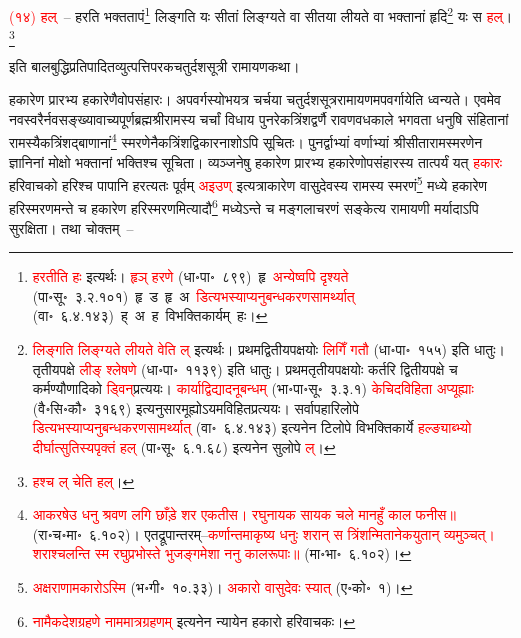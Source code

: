 \begin{sloppypar}\justifying\noindent\hspace{10mm} \textcolor{red}{(१४) हल्}~– हरति भक्त\-तापं\footnote{\textcolor{red}{हरतीति हः} इत्यर्थः। \textcolor{red}{हृञ् हरणे} (धा॰पा॰~८९९)~\arrow हृ~\arrow \textcolor{red}{अन्येष्वपि दृश्यते} (पा॰सू॰~३.२.१०१)~\arrow हृ~ड~\arrow हृ~अ~\arrow \textcolor{red}{डित्यभस्याप्यनु\-बन्धकरण\-सामर्थ्यात्} (वा॰~६.४.१४३)~\arrow ह्~अ~\arrow ह~\arrow विभक्तिकार्यम्~\arrow हः।} लिङ्गति यः सीतां लिङ्ग्यते वा सीतया लीयते वा भक्तानां हृदि\footnote{\textcolor{red}{लिङ्गति लिङ्ग्यते लीयते वेति ल्} इत्यर्थः। प्रथम\-द्वितीय\-पक्षयोः \textcolor{red}{लिगिँ गतौ} (धा॰पा॰~१५५) इति धातुः। तृतीयपक्षे \textcolor{red}{लीङ् श्लेषणे} (धा॰पा॰~११३९) इति धातुः। प्रथम\-तृतीय\-पक्षयोः कर्तरि द्वितीय\-पक्षे च कर्मण्यौणादिको \textcolor{red}{ड्विन्‌}\-प्रत्ययः। \textcolor{red}{कार्याद्विद्यादनूबन्धम्} (भा॰पा॰सू॰~३.३.१) \textcolor{red}{केचिदविहिता अप्यूह्याः} (वै॰सि॰कौ॰~३१६९) इत्यनुसारमूह्योऽ\-यमविहित\-प्रत्ययः। सर्वापहारि\-लोपे \textcolor{red}{डित्यभस्याप्यनु\-बन्धकरण\-सामर्थ्यात्} (वा॰~६.४.१४३) इत्यनेन टिलोपे विभक्ति\-कार्ये \textcolor{red}{हल्ङ्याब्भ्यो दीर्घात्सुतिस्यपृक्तं हल्} (पा॰सू॰~६.१.६८) इत्यनेन सुलोपे \textcolor{red}{ल्}।} यः स \textcolor{red}{हल्}।\footnote{\textcolor{red}{हश्च ल् चेति हल्}।}\end{sloppypar}
\begin{sloppypar}\justifying\noindent\hspace{10mm} इति बाल\-बुद्धि\-प्रतिपादित\-व्युत्पत्ति\-परक\-चतुर्दश\-सूत्री रामायण\-कथा।\end{sloppypar}
\begin{sloppypar}\justifying\noindent\hspace{10mm} हकारेण प्रारभ्य हकारेणैवोपसंहारः। अपवर्गस्योभयत्र चर्चया चतुर्दश\-सूत्र\-रामायणमपवर्गायेति ध्वन्यते। एवमेव नव\-स्वरैर्नव\-सङ्ख्या\-वाच्य\-पूर्ण\-ब्रह्म\-श्रीरामस्य चर्चां विधाय पुनरेक\-त्रिंशद्वर्णै रावण\-वध\-काले भगवता धनुषि संहितानां रामस्यैक\-त्रिंशद्बाणानां\footnote{\textcolor{red}{आकरषेउ धनु श्रवण लगि छाँड़े शर एकतीस। रघुनायक सायक चले मानहुँ काल फनीस॥} (रा॰च॰मा॰~६.१०२)। एतद्रूपान्तरम्–\textcolor{red}{कर्णान्तमाकृष्य धनुः शरान् स त्रिंशन्मितानेकयुतान् व्यमुञ्चत्। शराश्चलन्ति स्म रघुप्रभोस्ते भुजङ्गमेशा ननु कालरूपाः॥} (मा॰भा॰~६.१०२)।} स्मरणेनैक\-त्रिंशद्विकार\-नाशोऽपि सूचितः। पुनर्द्वाभ्यां वर्णाभ्यां श्रीसीता\-राम\-स्मरणेन ज्ञानिनां मोक्षो भक्तानां भक्तिश्च सूचिता। व्यञ्जनेषु हकारेण प्रारभ्य हकारेणोपसंहारस्य तात्पर्यं यत् \textcolor{red}{हकारः} हरि\-वाचको हरिश्च पापानि हरत्यतः पूर्वम् \textcolor{red}{अइउण्} इत्यत्राकारेण वासुदेवस्य रामस्य स्मरणं\footnote{\textcolor{red}{अक्षराणामकारोऽस्मि} (भ॰गी॰~१०.३३)। \textcolor{red}{अकारो वासुदेवः स्यात्} (ए॰को॰~१)।} मध्ये हकारेण हरि\-स्मरणमन्ते च हकारेण हरि\-स्मरणमित्यादौ\footnote{\textcolor{red}{नामैकदेशग्रहणे नाममात्रग्रहणम्} इत्यनेन न्यायेन हकारो हरिवाचकः।} मध्येऽन्ते च मङ्गलाचरणं सङ्केत्य रामायणी मर्यादाऽपि सुरक्षिता। तथा चोक्तम्~–\end{sloppypar}
